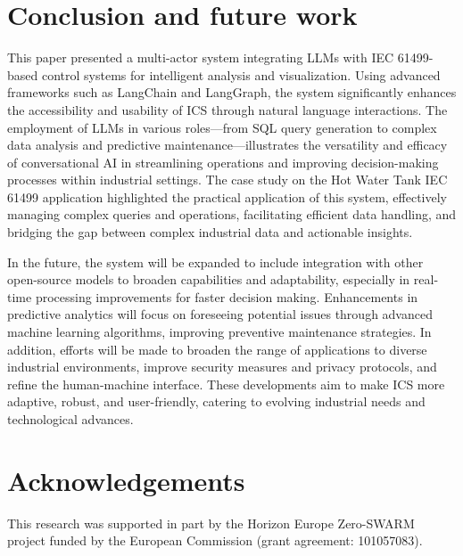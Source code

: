 \documentclass[conference]{IEEEtran}
\begin{document}
\section{Conclusion and future work}
\label{sec:conclusion}

This paper presented a multi-actor system integrating LLMs with IEC 61499-based control systems for intelligent analysis and visualization. Using advanced frameworks such as LangChain and LangGraph, the system significantly enhances the accessibility and usability of ICS through natural language interactions. The employment of LLMs in various roles—from SQL query generation to complex data analysis and predictive maintenance—illustrates the versatility and efficacy of conversational AI in streamlining operations and improving decision-making processes within industrial settings. The case study on the Hot Water Tank IEC 61499 application highlighted the practical application of this system, effectively managing complex queries and operations, facilitating efficient data handling, and bridging the gap between complex industrial data and actionable insights.

In the future, the system will be expanded to include integration with other open-source models to broaden capabilities and adaptability, especially in real-time processing improvements for faster decision making. Enhancements in predictive analytics will focus on foreseeing potential issues through advanced machine learning algorithms, improving preventive maintenance strategies. In addition, efforts will be made to broaden the range of applications to diverse industrial environments, improve security measures and privacy protocols, and refine the human-machine interface. These developments aim to make ICS more adaptive, robust, and user-friendly, catering to evolving industrial needs and technological advances.


\section{Acknowledgements}
This research was supported in part by the Horizon Europe Zero-SWARM project funded by the European Commission (grant agreement: 101057083).




\end{document}
